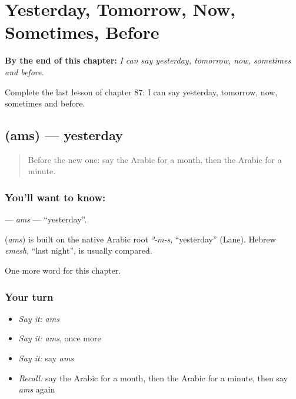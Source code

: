 
\chapter{Yesterday, Tomorrow, Now, Sometimes, Before}
\label{ch:ar-yesterday-tomorrow-now-sometimes-before}

\begin{chapteropening}
\textbf{By the end of this chapter:} \emph{I can say yesterday, tomorrow, now, sometimes and before.}

Complete the last lesson of chapter 87: I can say yesterday, tomorrow, now, sometimes and before.
\end{chapteropening}

\section[\texorpdfstring{\ar{أمس} (ams)}{أمس (ams)}]{ (ams) — yesterday}

\label{lesson:AR-C87-ams}



\begin{quote}
Before the new one: say the Arabic for a month, then the Arabic for a minute.
\end{quote}

\subsection*{You'll want to know: }
\textbf{} — \emph{ams} — \textquotedblleft{}yesterday\textquotedblright{}.

\begin{cousinweb}
\textbf{} (\emph{ams}) is built on the native Arabic root \emph{ʾ-m-s}, \textquotedblleft{}yesterday\textquotedblright{} (Lane). Hebrew \emph{emesh}, \textquotedblleft{}last night\textquotedblright{}, is usually compared.
\end{cousinweb}

\begin{grammarlens}[title={What you've built}]
One more word for this chapter.
\end{grammarlens}

\subsection*{Your turn}
\begin{itemize}
\raggedright
  \item \emph{Say it:} \emph{ams}
  \item \emph{Say it:} \emph{ams}, once more
  \item \emph{Say it:} say \emph{ams}
  \item \emph{Recall:} say the Arabic for a month, then the Arabic for a minute, then say \emph{ams} again
\end{itemize}

